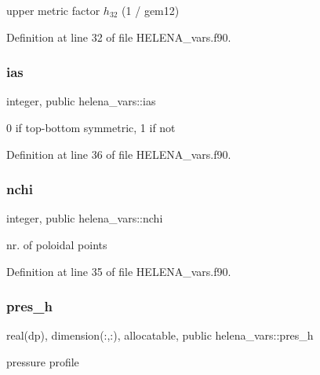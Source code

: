 upper metric factor $h_{32}$ (1 / {\ttfamily gem12}) 



Definition at line 32 of file H\+E\+L\+E\+N\+A\+\_\+vars.\+f90.

\mbox{\label{namespacehelena__vars_a009c168bb16124399a6059f7a6107a56}} 
\subsubsection{\texorpdfstring{ias}{ias}}
{\footnotesize\ttfamily integer, public helena\+\_\+vars\+::ias}



0 if top-\/bottom symmetric, 1 if not 



Definition at line 36 of file H\+E\+L\+E\+N\+A\+\_\+vars.\+f90.

\mbox{\label{namespacehelena__vars_a0489f36c6549c35a745ec6d540940d93}} 
\subsubsection{\texorpdfstring{nchi}{nchi}}
{\footnotesize\ttfamily integer, public helena\+\_\+vars\+::nchi}



nr. of poloidal points 



Definition at line 35 of file H\+E\+L\+E\+N\+A\+\_\+vars.\+f90.

\mbox{\label{namespacehelena__vars_a3c258f679dc87684823f378abdc851f0}} 
\subsubsection{\texorpdfstring{pres\+\_\+h}{pres\_h}}
{\footnotesize\ttfamily real(dp), dimension(\+:,\+:), allocatable, public helena\+\_\+vars\+::pres\+\_\+h}



pressure profile 



